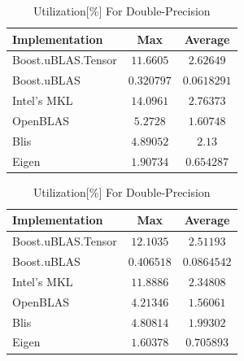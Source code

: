 \begin{table}[ht]
    \centering
    \caption{Utilization[\%] For Single-Precision}
    \begin{tabular}{|l|c|c|}
        \hline
        \textbf{Implementation} & \textbf{Max} & \textbf{Average}\\
        \hline
        Boost.uBLAS.Tensor  & $11.6605$& $2.62649$ \\
        \hline
        Boost.uBLAS         & $0.320797$& $0.0618291$ \\
        \hline
        Intel's MKL         & $14.0961$& $2.76373$ \\
        \hline
        OpenBLAS            & $5.2728$& $1.60748$ \\
        \hline
        Blis                & $4.89052$& $2.13$ \\
        \hline
        Eigen               & $1.90734$& $0.654287$ \\
        \hline
    \end{tabular}

    \vspace*{1 cm}

    \centering
    \caption{Utilization[\%] For Double-Precision}
    \begin{tabular}{|l|c|c|}
        \hline
        \textbf{Implementation} & \textbf{Max} & \textbf{Average}\\
        \hline
        Boost.uBLAS.Tensor  & $12.1035$ & $2.51193$ \\
        \hline
        Boost.uBLAS         & $0.406518$ & $0.0864542$ \\
        \hline
        Intel's MKL         & $11.8886$ & $2.34808$ \\
        \hline
        OpenBLAS            & $4.21346$ & $1.56061$ \\
        \hline
        Blis                & $4.80814$ & $1.99302$ \\
        \hline
        Eigen               & $1.60378$ & $0.705893$ \\
        \hline
    \end{tabular}
\end{table}

